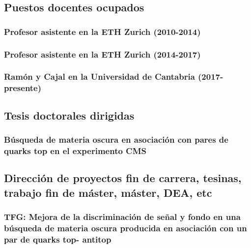 \documentclass[a4paper, 11pt, twoside, openright]{report}
\begin{document}
\subsection{Puestos docentes ocupados}

\subsubsection{Profesor asistente en la ETH Zurich (2010-2014)}


\subsubsection{Profesor asistente en la ETH Zurich (2014-2017)}


\subsubsection{Ramón y Cajal en la Universidad de Cantabria (2017-presente)}


\subsection{Tesis doctorales dirigidas}

\subsubsection{Búsqueda de materia oscura en asociación con pares de quarks top en el experimento CMS}




\subsection{Dirección de proyectos fin de carrera, tesinas, trabajo fin de máster, máster, DEA, etc}

\subsubsection{TFG: Mejora de la discriminación de señal y fondo en una búsqueda de materia oscura producida en asociación con un par de quarks top- antitop}

\end{document}
